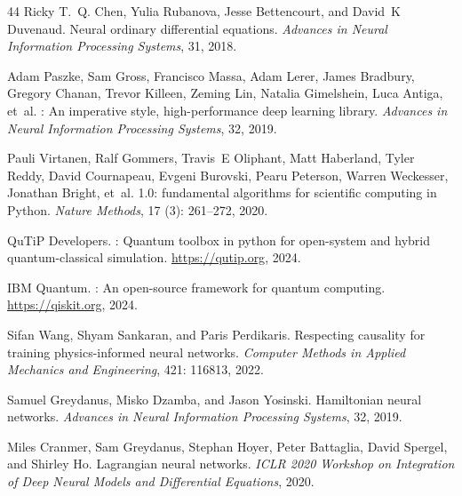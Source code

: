 \documentclass[11pt]{article}
\begin{document}
\begin{thebibliography}{44}
Ricky T.~Q. Chen, Yulia Rubanova, Jesse Bettencourt, and David~K Duvenaud.
\newblock Neural ordinary differential equations.
\newblock \emph{Advances in Neural Information Processing Systems}, 31, 2018.

Adam Paszke, Sam Gross, Francisco Massa, Adam Lerer, James Bradbury, Gregory
  Chanan, Trevor Killeen, Zeming Lin, Natalia Gimelshein, Luca Antiga, et~al.
: An imperative style, high-performance deep learning
  library.
\newblock \emph{Advances in Neural Information Processing Systems}, 32, 2019.

Pauli Virtanen, Ralf Gommers, Travis~E Oliphant, Matt Haberland, Tyler Reddy,
  David Cournapeau, Evgeni Burovski, Pearu Peterson, Warren Weckesser, Jonathan
  Bright, et~al.
 1.0: fundamental algorithms for scientific computing in
  {Python}.
\newblock \emph{Nature Methods}, 17 (3): 261--272, 2020.

{QuTiP Developers}.
: Quantum toolbox in python for open-system and hybrid
  quantum-classical simulation.
\newblock \url{https://qutip.org}, 2024.

{IBM Quantum}.
: An open-source framework for quantum computing.
\newblock \url{https://qiskit.org}, 2024.

Sifan Wang, Shyam Sankaran, and Paris Perdikaris.
\newblock Respecting causality for training physics-informed neural networks.
\newblock \emph{Computer Methods in Applied Mechanics and Engineering},
  421: 116813, 2022.

Samuel Greydanus, Misko Dzamba, and Jason Yosinski.
\newblock Hamiltonian neural networks.
\newblock \emph{Advances in Neural Information Processing Systems}, 32, 2019.

Miles Cranmer, Sam Greydanus, Stephan Hoyer, Peter Battaglia, David Spergel,
  and Shirley Ho.
\newblock Lagrangian neural networks.
\newblock \emph{ICLR 2020 Workshop on Integration of Deep Neural Models and
  Differential Equations}, 2020.


\end{thebibliography}
\end{document}
